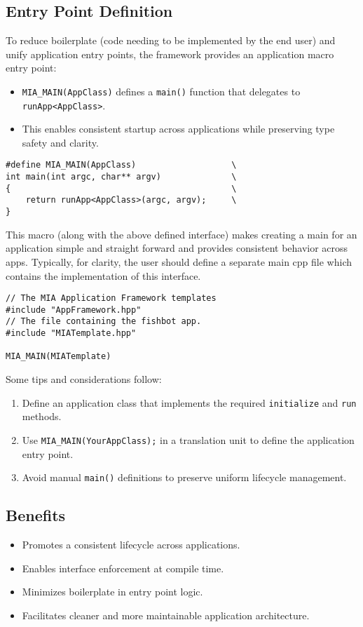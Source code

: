 \subsection*{Entry Point Definition}
To reduce boilerplate (code needing to be implemented by the end user) and unify application entry points, the framework provides an application macro entry point:
\begin{itemize}\itemsep0em
	\item \texttt{MIA\_MAIN(AppClass)} defines a \texttt{main()} function that delegates to \texttt{runApp<AppClass>}.
	\item This enables consistent startup across applications while preserving type safety and clarity.
\end{itemize}
\begin{lstlisting}[style=cppstyle]
#define MIA_MAIN(AppClass)                   \
int main(int argc, char** argv)              \
{                                            \
    return runApp<AppClass>(argc, argv);     \
}
\end{lstlisting}
This macro (along with the above defined interface) makes creating a main for an application simple and straight forward and provides consistent behavior across apps. Typically, for clarity, the user should define a separate main cpp file which contains the implementation of this interface.
\begin{lstlisting}[style=cppstyle]
// The MIA Application Framework templates
#include "AppFramework.hpp"
// The file containing the fishbot app.
#include "MIATemplate.hpp"

MIA_MAIN(MIATemplate)
\end{lstlisting}
Some tips and considerations follow:
\begin{enumerate}
	\item Define an application class that implements the required \texttt{initialize} and \texttt{run} methods.
	\item Use \texttt{MIA\_MAIN(YourAppClass);} in a translation unit to define the application entry point.
	\item Avoid manual \texttt{main()} definitions to preserve uniform lifecycle management.
\end{enumerate}

\subsection*{Benefits}
\begin{itemize}\itemsep0em
	\item Promotes a consistent lifecycle across applications.
	\item Enables interface enforcement at compile time.
	\item Minimizes boilerplate in entry point logic.
	\item Facilitates cleaner and more maintainable application architecture.
\end{itemize}











